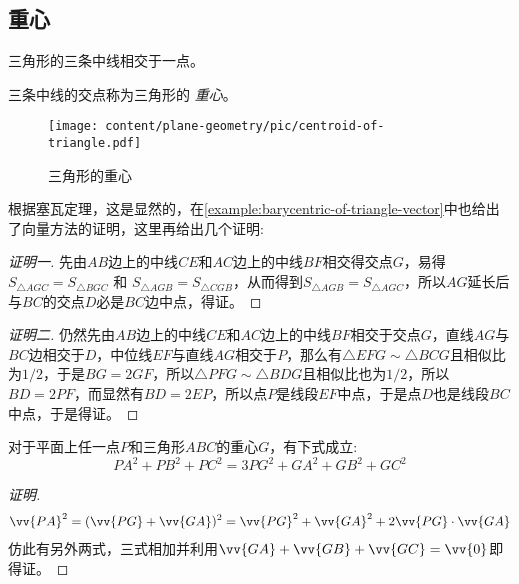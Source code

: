 \subsection{重心}
\label{sec:triangle-centroid}

\begin{theorem}
  三角形的三条中线相交于一点。
\end{theorem}


三条中线的交点称为三角形的 \emph{重心}。

\begin{figure}[htbp]
\centering
\texttt{[image: content/plane-geometry/pic/centroid-of-triangle.pdf]}
\caption{三角形的重心}
\label{fig:centroid-of-triangle}
\end{figure}

根据塞瓦定理，这是显然的，在\autoref{example:barycentric-of-triangle-vector}中也给出了向量方法的证明，这里再给出几个证明:
\begin{proof}[证明一]
  先由$AB$边上的中线$CE$和$AC$边上的中线$BF$相交得交点$G$，易得$S_{\triangle AGC} = S_{\triangle BGC}$ 和 $S_{\triangle AGB} = S_{\triangle CGB}$，从而得到$S_{\triangle AGB} = S_{\triangle AGC}$，所以$AG$延长后与$BC$的交点$D$必是$BC$边中点，得证。
\end{proof}

\begin{proof}[证明二]
  仍然先由$AB$边上的中线$CE$和$AC$边上的中线$BF$相交于交点$G$，直线$AG$与$BC$边相交于$D$，中位线$EF$与直线$AG$相交于$P$，那么有$\triangle EFG \sim \triangle BCG$且相似比为$1/2$，于是$BG=2GF$，所以$\triangle PFG \sim \triangle BDG$且相似比也为$1/2$，所以$BD=2PF$，而显然有$BD=2EP$，所以点$P$是线段$EF$中点，于是点$D$也是线段$BC$中点，于是得证。
\end{proof}

\begin{property}
  对于平面上任一点$P$和三角形$ABC$的重心$G$，有下式成立:
  \begin{equation}
    \label{eq:pa2-pb2-pc2-equal-3pg2-ga2-gb2-gc2}
    PA^2+PB^2+PC^2 = 3PG^2 + GA^2 + GB^2 + GC^2
  \end{equation}
\end{property}

\begin{proof}[证明]
  \begin{eqnarray*}
    \vv{PA}^2 = (\vv{PG}+\vv{GA})^2 = \vv{PG}^2 + \vv{GA}^2+2\vv{PG}\cdot\vv{GA}
  \end{eqnarray*}
  仿此有另外两式，三式相加并利用$\vv{GA}+\vv{GB}+\vv{GC}=\vv{0}$即得证。
\end{proof}

